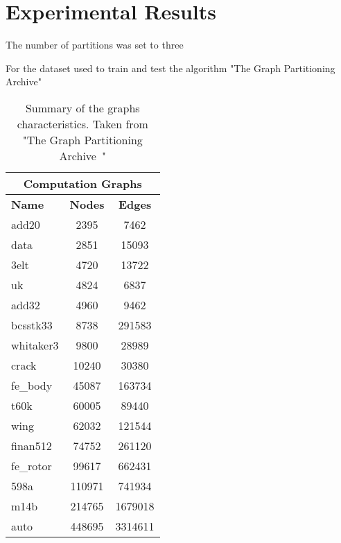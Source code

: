 %
%
\let\textcircled=\pgftextcircled
\chapter{Experimental Results}
\label{Chapter4}
The number of partitions was set to three 

For the dataset used to train and test the algorithm "The Graph Partitioning Archive"~\cite{archive}

\begin{table}
\centering
\begin{tabular}{ |p{1.75cm}||cc|  }
\hline
\multicolumn{3}{|c|}{\textbf{Computation Graphs}} \\
\hline
\hline
\textbf{Name} & \textbf{Nodes} & \textbf{Edges} \\
\hline
add20 & 2395 & 7462  \\
data & 2851 & 15093  \\
3elt & 4720 & 13722  \\
uk & 4824 & 6837  \\
add32 & 4960 & 9462  \\
bcsstk33 & 8738 & 291583  \\
whitaker3 & 9800 & 28989  \\
crack & 10240 & 30380  \\
\hline
fe\_body & 45087 & 163734  \\
t60k & 60005 & 89440  \\
wing & 62032 & 121544  \\
finan512 & 74752 & 261120 \\
\hline
fe\_rotor & 99617 & 662431  \\
598a & 110971 & 741934  \\
m14b & 214765 & 1679018	 \\
auto & 448695 & 3314611  \\
\hline
\end{tabular}
\caption{\label{tab:comp_graphs}Summary of the graphs characteristics. Taken from "The Graph Partitioning Archive~\cite{archive}"}
\end{table}
